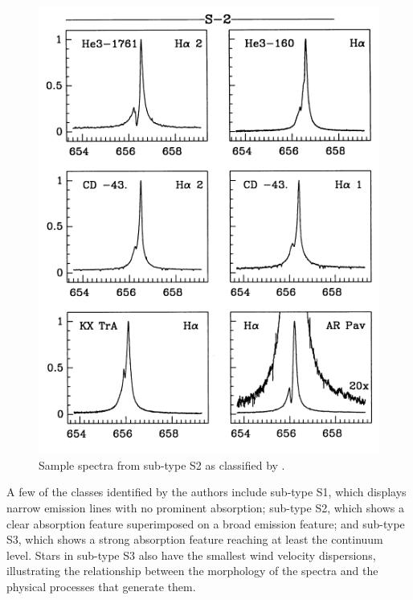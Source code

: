 \begin{figure}[!htb]
\centering
\includegraphics[scale=0.75]{figures/van.png}
\caption{Sample spectra from sub-type S2 as classified by \citet{van1993atlas}.}
\end{figure}

A few of the classes identified by the authors include sub-type S1, which displays narrow emission lines with no prominent absorption; sub-type S2, which shows a clear absorption feature superimposed on a broad emission feature; and sub-type S3, which shows a strong absorption feature reaching at least the continuum level. Stars in sub-type S3 also have the smallest wind velocity dispersions, illustrating the relationship between the morphology of the spectra and the physical processes that generate them.

